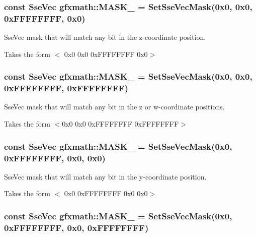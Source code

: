 \subsubsection[{M\+A\+S\+K\+\_\+0010}]{\setlength{\rightskip}{0pt plus 5cm}const {\bf Sse\+Vec} gfxmath\+::\+M\+A\+S\+K\+\_ = {\bf Set\+Sse\+Vec\+Mask}(0x0, 0x0, 0x\+F\+F\+F\+F\+F\+F\+F\+F, 0x0)}\label{namespacegfxmath_a8cb1abe895cbdf8c2bfd4aebad8d8593}


Sse\+Vec mask that will match any bit in the z-\/coordinate position. 

Takes the form $<$ 0x0 0x0 0x\+F\+F\+F\+F\+F\+F\+F\+F 0x0$>$ \hypertarget{namespacegfxmath_ab0a1cad00f30a2a2967afd4076b70d14}{}
\subsubsection[{M\+A\+S\+K\+\_\+0011}]{\setlength{\rightskip}{0pt plus 5cm}const {\bf Sse\+Vec} gfxmath\+::\+M\+A\+S\+K\+\_ = {\bf Set\+Sse\+Vec\+Mask}(0x0, 0x0, 0x\+F\+F\+F\+F\+F\+F\+F\+F, 0x\+F\+F\+F\+F\+F\+F\+F\+F)}\label{namespacegfxmath_ab0a1cad00f30a2a2967afd4076b70d14}


Sse\+Vec mask that will match any bit in the z or w-\/coordinate positions. 

Takes the form $<$0x0 0x0 0x\+F\+F\+F\+F\+F\+F\+F\+F 0x\+F\+F\+F\+F\+F\+F\+F\+F$>$ \hypertarget{namespacegfxmath_a2e6aab98443e9d5e2fe4270a1ed690ea}{}
\subsubsection[{M\+A\+S\+K\+\_\+0100}]{\setlength{\rightskip}{0pt plus 5cm}const {\bf Sse\+Vec} gfxmath\+::\+M\+A\+S\+K\+\_ = {\bf Set\+Sse\+Vec\+Mask}(0x0, 0x\+F\+F\+F\+F\+F\+F\+F\+F, 0x0, 0x0)}\label{namespacegfxmath_a2e6aab98443e9d5e2fe4270a1ed690ea}


Sse\+Vec mask that will match any bit in the y-\/coordinate position. 

Takes the form $<$ 0x0 0x\+F\+F\+F\+F\+F\+F\+F\+F 0x0 0x0$>$ \hypertarget{namespacegfxmath_ab4dafd60d94026a9b0a4ff0593680a25}{}
\subsubsection[{M\+A\+S\+K\+\_\+0101}]{\setlength{\rightskip}{0pt plus 5cm}const {\bf Sse\+Vec} gfxmath\+::\+M\+A\+S\+K\+\_ = {\bf Set\+Sse\+Vec\+Mask}(0x0, 0x\+F\+F\+F\+F\+F\+F\+F\+F, 0x0, 0x\+F\+F\+F\+F\+F\+F\+F\+F)}\label{namespacegfxmath_ab4dafd60d94026a9b0a4ff0593680a25}


